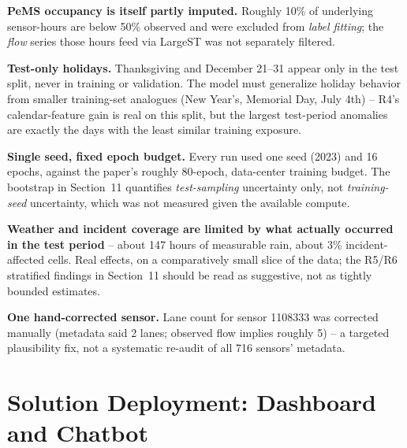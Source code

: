 \documentclass[11pt]{article}
\begin{document}
\begin{riskbox}
\textbf{PeMS occupancy is itself partly imputed.} Roughly 10\% of underlying sensor-hours are
below 50\% observed and were excluded from \emph{label fitting}; the \emph{flow} series those
hours feed via LargeST was not separately filtered.
\end{riskbox}

\begin{riskbox}
\textbf{Test-only holidays.} Thanksgiving and December 21--31 appear only in the test split,
never in training or validation. The model must generalize holiday behavior from smaller
training-set analogues (New Year's, Memorial Day, July 4th) -- R4's calendar-feature gain is real
on this split, but the largest test-period anomalies are exactly the days with the least similar
training exposure.
\end{riskbox}

\begin{riskbox}
\textbf{Single seed, fixed epoch budget.} Every run used one seed (2023) and 16 epochs, against
the paper's roughly 80-epoch, data-center training budget. The bootstrap in Section~11 quantifies
\emph{test-sampling} uncertainty only, not \emph{training-seed} uncertainty, which was not
measured given the available compute.
\end{riskbox}

\begin{riskbox}
\textbf{Weather and incident coverage are limited by what actually occurred in the test
period} -- about 147 hours of measurable rain, about 3\% incident-affected cells. Real effects,
on a comparatively small slice of the data; the R5/R6 stratified findings in Section~11 should be
read as suggestive, not as tightly bounded estimates.
\end{riskbox}

\begin{riskbox}
\textbf{One hand-corrected sensor.} Lane count for sensor 1108333 was corrected manually
(metadata said 2 lanes; observed flow implies roughly 5) -- a targeted plausibility fix, not a
systematic re-audit of all 716 sensors' metadata.
\end{riskbox}

\section{Solution Deployment: Dashboard and Chatbot}
\end{document}
